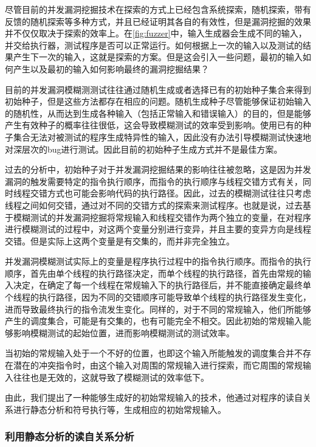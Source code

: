 尽管目前的并发漏洞挖掘技术在探索的方式上已经包含系统探索，随机探索，带有反馈的随机探索等多种方式，并且已经证明其各自的有效性，但是漏洞挖掘的效果并不仅仅取决于探索的效率上。在\autoref{fig:fuzzer}中，输入生成器会生成不同的输入，并交给执行器，测试程序是否可以正常运行。如何根据上一次的输入以及测试的结果产生下一次的输入，这就是探索的方案。但是这会引入一些问题，最初的输入如何产生以及最初的输入如何影响最终的漏洞挖掘结果？

目前的并发漏洞模糊测测试往往通过随机生成或者选择已有的初始种子集合来得到初始种子，但是这些方法都存在相应的问题。随机生成种子尽管能够保证初始输入的随机性，从而达到生成各种输入（包括正常输入和错误输入）的目的，但是能够产生有效种子的概率往往很低，这会导致模糊测试的效率受到影响。使用已有的种子集合无法对被测试的程序生成特异性的输入，因此没有办法引导模糊测试快速地对深层次的bug进行测试。因此目前的初始种子生成方式并不是最佳方案。

过去的分析中，初始种子对于并发漏洞挖掘结果的影响往往被忽略，这是因为并发漏洞的触发需要特定的指令执行顺序，而指令的执行顺序与线程交错方式有关，同时线程交错方式也可能会影响代码的执行路径。因此，过去的模糊测试往往只考虑线程之间如何交错，通过对不同的交错方式的探索来测试程序。也就是说，过去基于模糊测试的并发漏洞挖掘将常规输入和线程交错作为两个独立的变量，在对程序进行模糊测试的过程中，对这两个变量分别进行变异，并且主要的变异方向是线程交错。但是实际上这两个变量是有交集的，而并非完全独立。

并发漏洞模糊测试实际上的变量是程序执行过程中的指令执行顺序。而指令的执行顺序，首先由单个线程的执行路径决定，而单个线程的执行路径，首先由常规的输入决定，在确定了每一个线程在常规输入下的执行路径后，并不能直接确定最终单个线程的执行路径，因为不同的交错顺序可能导致单个线程的执行路径发生变化，进而导致最终执行的指令流发生变化。同样的，对于不同的常规输入，他们所能够产生的调度集合，可能是有交集的，也有可能完全不相交。因此初始的常规输入能够影响模糊测试的起始位置，进而影响模糊测试的测试效率。

当初始的常规输入处于一个不好的位置，也即这个输入所能触发的调度集合并不存在潜在的冲突指令时，由这个输入对周围的常规输入进行探索，而它周围的常规输入往往也是无效的，这就导致了模糊测试的效率低下。

由此，我们提出了一种能够生成好的初始常规输入的技术，他通过对程序的读自关系进行静态分析和符号执行等，生成相应的初始常规输入。

\subsubsection{利用静态分析的读自关系分析}

